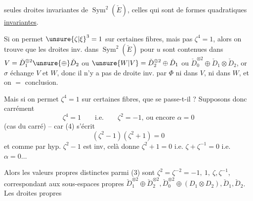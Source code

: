 seules droites invariantes  de $\operatorname{Sym}^2(\check E)$,  celles qui sont  de formes quadratiques \uline{invariantes}.

Si on permet  ${\unsure{\zeta|\xi}}^3=1$ sur certaines fibres,   mais pas $\zeta^4=1$, alors on trouve que les droites inv. dans $\operatorname{Sym}^2(\check E)$ pour $u$ sont contenues  dans $V=\check D_1^{\otimes2}\unsure{\oplus}\check D_2$ ou $\unsure{W|V}=\check D_2^{\otimes2}\oplus\check D_1$ ou $\check D_0^{\otimes2}\oplus\check D_1\otimes\check D_2$, or $\sigma$ échange $V$ et $W$, donc il n'y a pas de droite inv. par $\Phi$ ni dans $V$, ni dans $W$, et on  $=$ conclusion.

Mais si on permet $\zeta^4=1$ sur certaines fibres, que se passe-t-il ? Supposons donc carrément 
\[
\zeta^4=1\qquad\text{i.e.}\qquad\zeta^2=-1,\ \text{ou encore }\alpha=0
\tag*{(4)}
\]
(cas du carré) -- car (4) s'écrit
\[
(\zeta^2-1)(\zeta^2+1)=0
\]
et comme par hyp. $\zeta^2-1$ est inv, celà donne $\zeta^2+1=0$ i.e. $\zeta+\zeta^{-1}=0$ i.e. $\alpha=0\ldots$

Alors les valeurs propres distinctes parmi (3) sont $\zeta^2=\zeta^{-2}=-1,\ 1,\ \zeta,\zeta^{-1}$, correspondant aux sous-espaces propres $\check D_1^{\otimes2}\oplus\check D_2^{\otimes2},\check D_0^{\otimes2}\oplus(D_1\otimes D_2),\check D_1,\check D_2$. Les droites propres
